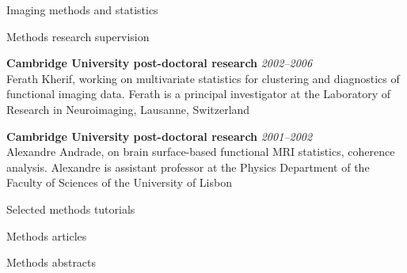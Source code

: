 \documentclass{cv}
\newcommand{\PlaceDateNote}[3]{{\bf #1} \hfill {\em #2} \\#3}
\begin{document}
\begin{cvSection}{Imaging methods and statistics}
\begin{cvSubSection}{Methods research supervision}

\PlaceDateNote{Cambridge University post-doctoral research}{2002--2006}
{Ferath Kherif, working on multivariate statistics for clustering and
diagnostics of functional imaging data. Ferath is a principal investigator at
the Laboratory of Research in Neuroimaging, Lausanne, Switzerland}

\PlaceDateNote{Cambridge University post-doctoral research}{2001--2002}
{Alexandre Andrade, on brain surface-based functional MRI statistics, coherence
analysis.  Alexandre is assistant professor at the Physics Department of the
Faculty of Sciences of the University of Lisbon}

\end{cvSubSection}

\begin{cvSubSection}{Selected methods tutorials}

\printbibliography[heading=none,
    filter=methodsOrStatistics,
    keyword=online,
notkeyword=omit]

\end{cvSubSection}

\begin{cvSubSection}{Methods articles}

\printbibliography[heading=none,
    keyword=methods,
    keyword=article,
notkeyword=omit]

\end{cvSubSection}

\begin{cvSubSection}{Methods abstracts}

\printbibliography[heading=none,
    keyword=methods,
    keyword=abstract,
notkeyword=omit]

\end{cvSubSection}

\end{cvSection}
\end{document}
